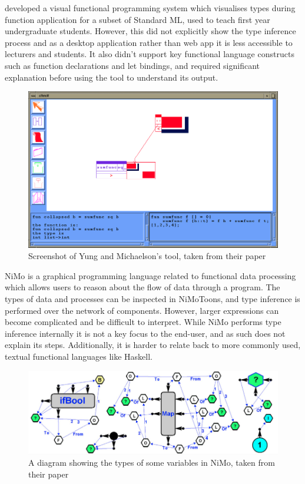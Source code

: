 \documentclass[a4paper,fleqn,12pt]{article}
\begin{document}
\cite{ref7} developed a visual functional programming system which visualises types during function application for a subset of Standard ML, used to teach first year undergraduate students. However, this did not explicitly show the type inference process and as a desktop application rather than web app it is less accessible to lecturers and students. It also didn’t support key functional language constructs such as function declarations and let bindings, and required significant explanation before using the tool to understand its output.

{\centering \begin{figure}[h!]
  \centering
  \includegraphics[width=0.797\linewidth]{images/image1.png}
  \caption{Screenshot of Yung and Michaelson's tool, taken from their paper}
\end{figure} \par}

NiMo \citep{ref8} is a graphical programming language related to functional data processing which allows users to reason about the flow of data through a program. The types of data and processes can be inspected in NiMoToons, and type inference is performed over the network of components. However, larger expressions can become complicated and be difficult to interpret. While NiMo performs type inference internally it is not a key focus to the end-user, and as such does not explain its steps. Additionally, it is harder to relate back to more commonly used, textual functional languages like Haskell.

{\centering \begin{figure}[h!]
  \centering
  \includegraphics[width=0.960\linewidth]{images/image3.png}
  \caption{A diagram showing the types of some variables in NiMo, taken from their paper}
\end{figure} \par}
\end{document}

